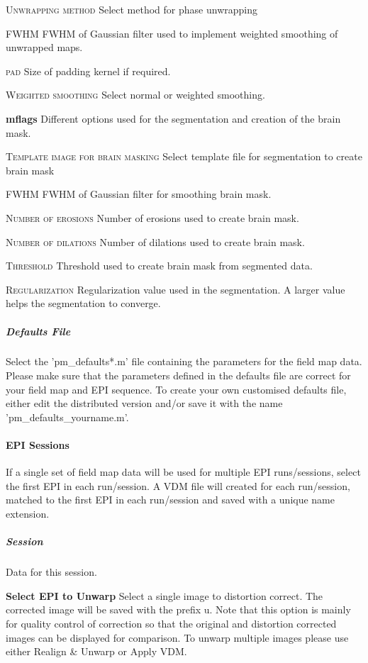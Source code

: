 \textsc{Unwrapping method}
Select method for phase unwrapping


\textsc{FWHM}
FWHM of Gaussian filter used to implement weighted smoothing of unwrapped maps.


\textsc{pad}
Size of padding kernel if required.


\textsc{Weighted smoothing}
Select normal or weighted smoothing.


\textbf{mflags}
Different options used for the segmentation and creation of the brain mask.


\textsc{Template image for brain masking}
Select template file for segmentation to create brain mask


\textsc{FWHM}
FWHM of Gaussian filter for smoothing brain mask.


\textsc{Number of erosions}
Number of erosions used to create brain mask.


\textsc{Number of dilations}
Number of dilations used to create brain mask.


\textsc{Threshold}
Threshold used to create brain mask from segmented data.


\textsc{Regularization}
Regularization value used in the segmentation. A larger value helps the segmentation to converge.


\subparagraph{Defaults File \label{PMDEF}}
Select the 'pm\_defaults*.m' file containing the parameters for the field map data. Please make sure that the parameters defined in the defaults file are correct for your field map and EPI sequence. To create your own customised defaults file, either edit the distributed version and/or save it with the name 'pm\_defaults\_yourname.m'.


\paragraph{EPI Sessions}
If a single set of field map data will be used for multiple EPI runs/sessions, select the first EPI in each run/session. A VDM file will created for each run/session, matched to the first EPI in each run/session and saved with a unique name extension.


\subparagraph{Session}
Data for this session.


\textbf{Select EPI to Unwarp}
Select a single image to distortion correct. The corrected image will be saved with the prefix u. Note that this option is mainly for quality control of correction so that the original and distortion corrected images can be displayed for comparison. To unwarp multiple images please use either Realign \& Unwarp or Apply VDM.


